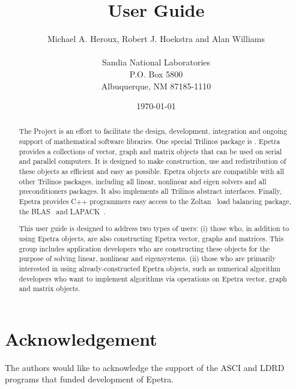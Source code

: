 \documentclass[12pt,relax]{EpetraUserGuide}
\title{\EpetraTM{} User Guide}
\author{Michael A. Heroux, Robert J. Hoekstra and Alan Williams \\
	\\
	    Sandia National Laboratories\\
	    P.O. Box 5800\\
	    Albuquerque, NM 87185-1110 
	 }
\date{\today} %
\begin{document}
\maketitle

\begin{abstract}

The \TrilinosTM{} Project is an effort to facilitate the design, development,
integration and ongoing support of mathematical software libraries.
One special Trilinos package is \EpetraTM{}.  Epetra provides a collections of
vector, graph and matrix objects that can be used on serial
and parallel computers.  It is designed to make construction, use and redistribution
of these objects as efficient and easy as possible.  Epetra objects are compatible with all
other Trilinos packages, including all linear, nonlinear and eigen solvers and all
preconditioners packages.  It also implements all Trilinos abstract
interfaces.  Finally, Epetra 
provides C++ programmers easy access to the Zoltan~\cite{zoltan-ug}
load balancing package, the BLAS~\cite{BLAS1,BLAS2,BLAS3} and LAPACK~\cite{lapack}.

This user guide is designed to address two types of users: 
(i) those who, in addition to using Epetra
objects, are also constructing Epetra vector, graphs and matrices.  This group
includes application developers who are constructing these objects for the purpose
of solving linear, nonlinear and eigensystems.
(ii) those who
are primarily interested in using already-constructed Epetra objects, such as 
numerical algorithm developers who want to implement algorithms via 
operations on Epetra vector, graph and matrix objects. 
\end{abstract}


\section*{Acknowledgement}
The authors would like to acknowledge the support of the ASCI and LDRD 
programs that funded development of Epetra.

\clearpage
\tableofcontents
\listoffigures
\listoftables

\clearpage
\end{document}
